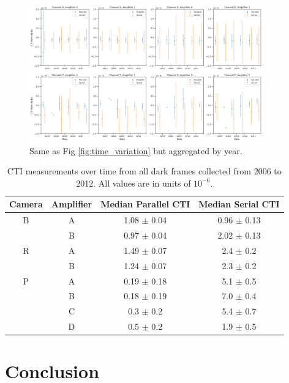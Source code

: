 \begin{figure}
    \centering
    \includegraphics[width=0.9\textwidth]{figures/cte/time_variation_by_year.png}
    \caption{Same as Fig \ref{fig:time_variation} but aggregated by year.}
    \label{fig:time_variation_binned}
\end{figure}

\begin{table}[htbp]
    \centering
    \begin{tabular}{cccc}\toprule
        Camera & Amplifier & Median Parallel CTI  & Median Serial CTI \\ \midrule
        B & A &   1.08 $\pm$ 0.04  &  0.96 $\pm$ 0.13 \\
          & B &   0.97 $\pm$ 0.04  &  2.02 $\pm$ 0.13 \\\midrule
        R & A &   1.49 $\pm$ 0.07  &  2.4  $\pm$ 0.2 \\
          & B &   1.24 $\pm$ 0.07  &  2.3  $\pm$ 0.2 \\\midrule
        P & A &   0.19 $\pm$ 0.18  &  5.1  $\pm$ 0.5 \\
          & B &   0.18 $\pm$ 0.19  &  7.0  $\pm$ 0.4 \\
          & C &   0.3  $\pm$ 0.2   &  5.4  $\pm$ 0.7 \\
          & D &   0.5  $\pm$ 0.2   &  1.9  $\pm$ 0.5 \\\midrule
    \end{tabular}
    \caption{CTI measurements over time from all dark frames collected from 2006 to 2012. All values are in units of $10^{-6}$.}
    \label{tab:cte_darks}
\end{table}

\section{Conclusion}


